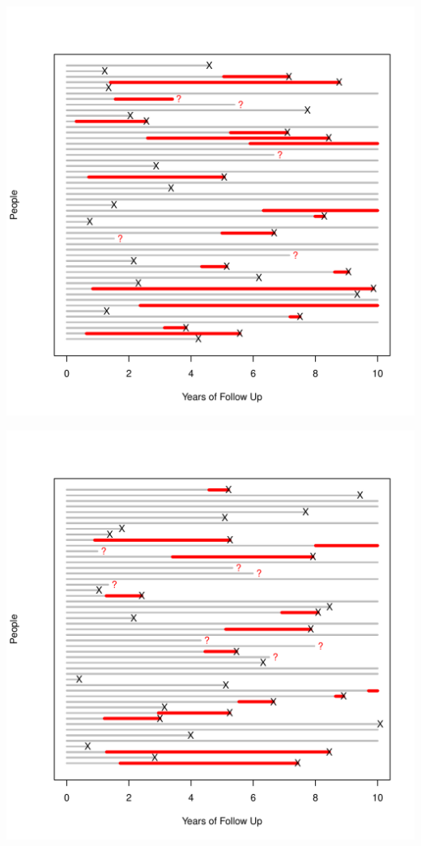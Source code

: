 \documentclass{article}\usepackage{graphicx, color}
\newenvironment{knitrout}{}{} %
\begin{document}
\begin{knitrout}
\color{fgcolor}\includegraphics[width=6in]{figure/eight} 
\end{knitrout}


\begin{knitrout}
\color{fgcolor}\includegraphics[width=6in]{figure/nine} 
\end{knitrout}
\end{document}
